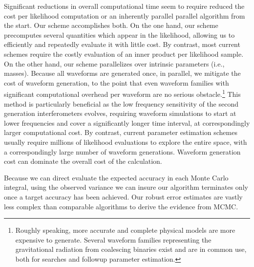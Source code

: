 Significant reductions in overall computational time seem to  require  reduced the cost per likelihood computation or an
inherently parallel  parallel algorithm from the start. Our scheme accomplishes both.  
%
On the one hand, our scheme precomputes several quantities which appear in the likelihood, allowing us to  efficiently and
repeatedly evaluate it with little cost.  By contrast, most current schemes  require the costly evaluation of an inner
product per likelihood sample.  
%
%
On the other hand, our scheme parallelizes over intrinsic parameters (i.e., masses).    Because all waveforms are
generated once, in parallel, we mitigate the cost of waveform generation, to the point that even waveform families with
significant computational overhead per waveform are no serious obstacle.\footnote{Roughly speaking, more accurate and
complete physical models are more expensive to generate. Several waveform families representing the gravitational radiation from coalescing binaries exist and are in common use,
both for searches and followup parameter
estimation\cite{gw-astro-mergers-approximations-SpinningPNHigherHarmonics,gw-astro-PN-Comparison-AlessandraSathya2009,gw-astro-EOBspin-Tarrachini2012,gw-astro-EOBNR-Calibrated-2009}.}  This method is particularly beneficial as 
the low frequency sensitivity of the second generation interferometers evolves, requiring  waveform simulations to start
at lower frequencies and cover a significantly longer time interval, at correspondingly larger computational cost. 
%
By contrast, current parameter estimation schemes usually require millions of likelihood evaluations
to explore the entire space, with a correspondingly large number of  waveform generations.   Waveform generation cost
can dominate the overall cost of the calculation.


Because we can direct evaluate the expected accuracy in each Monte Carlo integral, using the observed variance we can
insure our algorithm terminates only once  a target accuracy has been achieved.   Our robust error estimates are  vastly less complex than comparable algorithms to derive the evidence from MCMC\cite{gwastro-mergers-HeeSuk-CompareToPE-Aligned,mm-stats-MCMC-GeometricLaddear-Neal,mm-stats-MCMC-GeometricLadderChoices-Liu,mm-stats-EvidenceFromMCMC-Weinberg2009,2007PhRvD..75f2004R,2008ApJ...688L..61V,2009PhRvD..80f3007L, 2009CQGra..26k4007R,2011RvMP...83..943V}.

